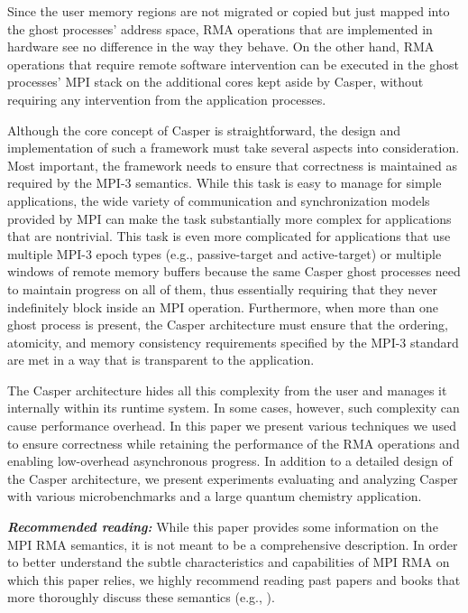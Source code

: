 Since the user memory regions are not migrated or copied but just
mapped into the ghost processes' address space, RMA operations that
are implemented in hardware see no difference in the way they behave.
On the other hand, RMA operations that require remote software
intervention can be executed in the ghost processes' MPI stack on the
additional cores kept aside by Casper, without requiring any
intervention from the application processes.

Although the core concept of Casper is straightforward, the design and
implementation of such a framework must take several aspects into
consideration.  Most important, the framework needs to ensure that
correctness is maintained as required by the MPI-3 semantics.  While this task is
easy to manage for simple applications, the wide variety of
communication and synchronization models provided by MPI can make the task
substantially more complex for applications that are nontrivial.
This task is even more complicated for applications that use multiple
MPI-3 epoch types (e.g., passive-target and active-target) or multiple
windows of remote memory buffers because the same Casper ghost
processes need to maintain progress on all of them, thus essentially
requiring that they never indefinitely block inside an MPI operation.
Furthermore, when more than one ghost process is present, the Casper
architecture must ensure that the ordering, atomicity, and memory
consistency requirements specified by the MPI-3 standard are met in a
way that is transparent to the application.

The Casper architecture hides all this complexity from the user and
manages it internally within its runtime system.  In some
cases, however, such complexity can cause performance overhead.  In this paper
we present various techniques we used to ensure correctness while
retaining the performance of the RMA operations and enabling
low-overhead asynchronous progress.  In addition to a detailed design
of the Casper architecture, we present
experiments evaluating and analyzing Casper with various
microbenchmarks and a large quantum chemistry application.

\textbf{\em Recommended reading:} While this paper provides some
information on the MPI RMA semantics, it is not meant to be a
comprehensive description.
In order to better understand the subtle
characteristics and capabilities of MPI RMA on which this paper
relies,
we highly recommend
reading past papers and books that more
thoroughly discuss these semantics (e.g., \cite{hoefler13:mpi3-rma,
  gropp99:using-mpi-2}).
